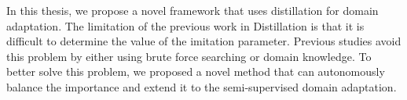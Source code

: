 In this thesis, we propose a novel framework that uses distillation for domain adaptation.
The limitation of the previous work in Distillation is that it is difficult to determine the value of the imitation parameter. Previous studies avoid this problem by either using brute force searching or domain knowledge. To better solve this problem, we proposed a novel method that can autonomously balance the importance and extend it to the semi-supervised domain adaptation.

